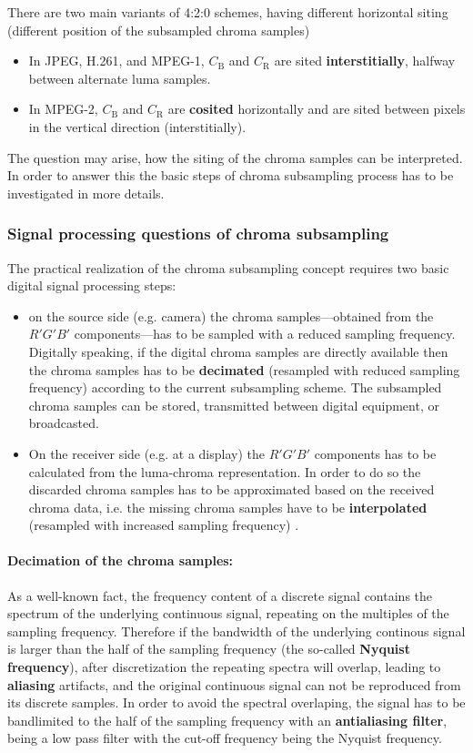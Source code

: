 \begin{itemize}
There are two main variants of 4:2:0 schemes, having different horizontal siting (different position of the subsampled chroma samples)
\begin{itemize}
\item In JPEG, H.261, and MPEG-1, $C_{\mathrm{B}}$ and $C_{\mathrm{R}}$ are sited \textbf{interstitially}, halfway between alternate luma samples.
\item In MPEG-2, $C_{\mathrm{B}}$ and $C_{\mathrm{R}}$ are \textbf{cosited} horizontally and are sited between pixels in the vertical direction (interstitially).
\end{itemize}
\end{itemize}
The question may arise, how the siting of the chroma samples can be interpreted.
In order to answer this the basic steps of chroma subsampling process has to be investigated in more details.


\subsubsection*{Signal processing questions of chroma subsampling}

The practical realization of the chroma subsampling concept requires two basic digital signal processing steps:
\begin{itemize}
\item on the source side (e.g. camera) the chroma samples---obtained from the $R'G'B'$ components---has to be sampled with a reduced sampling frequency. 
Digitally speaking, if the digital chroma samples are directly available then the chroma samples has to be \textbf{decimated} (resampled with reduced sampling frequency) according to the current subsampling scheme.
The subsampled chroma samples can be stored, transmitted between digital equipment, or broadcasted. 
\item On the receiver side (e.g. at a display) the $R'G'B'$ components has to be calculated from the luma-chroma representation.
In order to do so the discarded chroma samples has to be approximated based on the received chroma data, i.e. the missing chroma samples have to be \textbf{interpolated} (resampled with increased sampling frequency) .
\end{itemize}

\paragraph{Decimation of the chroma samples:}
As a well-known fact, the frequency content of a discrete signal contains the spectrum of the underlying continuous signal, repeating on the multiples of the sampling frequency.
Therefore if the bandwidth of the underlying continous signal is larger than the half of the sampling frequency (the so-called \textbf{Nyquist frequency}), after discretization the repeating spectra will overlap, leading to \textbf{aliasing} artifacts, and the original continuous signal can not be reproduced from its discrete samples.
In order to avoid the spectral overlaping, the signal has to be bandlimited to the half of the sampling frequency with an \textbf{antialiasing filter}, being a low pass filter with the cut-off frequency being the Nyquist frequency.

